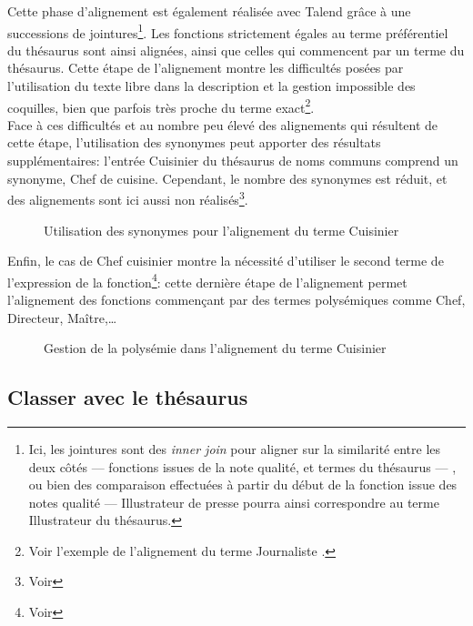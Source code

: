 Cette phase d'alignement est également réalisée avec Talend grâce à une successions de jointures\footnote{Ici, les jointures sont des \textit{inner join} pour aligner sur la similarité entre les deux côtés --- fonctions issues de la note qualité, et termes du thésaurus --- , ou bien des comparaison effectuées à partir du début de la fonction issue des notes qualité --- \og Illustrateur de presse\fg{} pourra ainsi correspondre au terme \og Illustrateur\fg{} du thésaurus.}. Les fonctions strictement égales au terme préférentiel du thésaurus sont ainsi alignées, ainsi que celles qui commencent par un terme du thésaurus. Cette étape de l'alignement montre les difficultés posées par l'utilisation du texte libre dans la description et la gestion impossible des coquilles, bien que parfois très proche du terme exact\footnote{Voir l'exemple de l'alignement du terme \og Journaliste\fg{} .}.\\

Face à ces difficultés et au nombre peu élevé des alignements qui résultent de cette étape, l'utilisation des synonymes peut apporter des résultats supplémentaires: l'entrée \og Cuisinier\fg{} du thésaurus de noms communs comprend un synonyme, \og Chef de cuisine\fg{}. Cependant, le nombre des synonymes est réduit, et des alignements sont ici aussi non réalisés\footnote{Voir }.
\begin{figure}[!h]
	\centering
	\caption{Utilisation des synonymes pour l'alignement du terme \og Cuisinier\fg{}}
	\label{alignement_cuisinier}
\end{figure}

Enfin, le cas de \og Chef cuisinier\fg{} montre la nécessité d'utiliser le second terme de l'expression de la fonction\footnote{Voir }: cette dernière étape de l'alignement permet l'alignement des fonctions commençant par des termes polysémiques comme \og Chef\fg{}, \og Directeur\fg{}, \og Maître\fg{},\dots
\begin{figure}[!h]
	\centering
	\caption{Gestion de la polysémie dans l'alignement du terme \og Cuisinier\fg{}}
	\label{alignement_cuisinier_polysemie}
\end{figure}

\subsection{\label{I-C-3-c}Classer avec le thésaurus}



